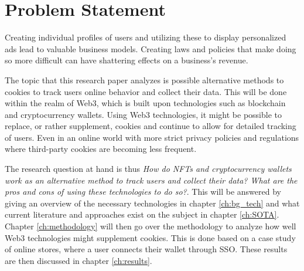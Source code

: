 \chapter{Problem Statement}
\label{ch:problem}

Creating individual profiles of users and utilizing these to display personalized ads lead to valuable business models. Creating laws and policies that make doing so more difficult can have shattering effects on a business's revenue.

The topic that this research paper analyzes is possible alternative methods to cookies to track users online behavior and collect their data. This will be done within the realm of Web3, which is built upon technologies such as blockchain and cryptocurrency wallets. Using Web3 technologies, it might be possible to replace, or rather supplement, cookies and continue to allow for detailed tracking of users. Even in an online world with more strict privacy policies and regulations where third-party cookies are becoming less frequent.

The research question at hand is thus \textit{How do NFTs and cryptocurrency wallets work as an alternative method to track users and collect their data? What are the pros and cons of using these technologies to do so?}. This will be answered by giving an overview of the necessary technologies in chapter \ref{ch:bg_tech} and what current literature and approaches exist on the subject in chapter \ref{ch:SOTA}. Chapter \ref{ch:methodology} will then go over the methodology to analyze how well Web3 technologies might supplement cookies. This is done based on a case study of online stores, where a user connects their wallet through SSO. These results are then discussed in chapter \ref{ch:results}.